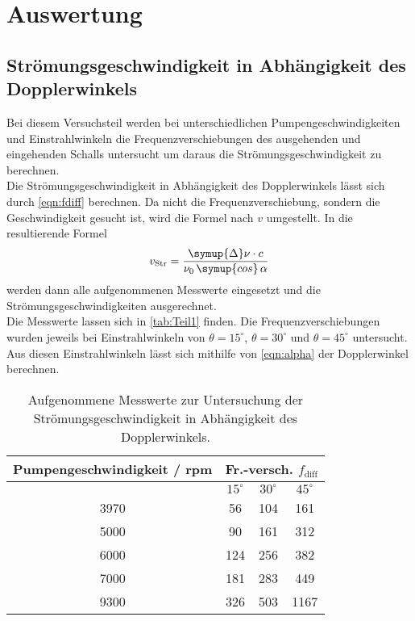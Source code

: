 \section{Auswertung}
\label{sec:Auswertung}

\subsection{Strömungsgeschwindigkeit in Abhängigkeit des Dopplerwinkels}

Bei diesem Versuchsteil werden bei unterschiedlichen Pumpengeschwindigkeiten und Einstrahlwinkeln die
Frequenzverschiebungen des ausgehenden und eingehenden Schalls untersucht um daraus die Strömungsgeschwindigkeit
zu berechnen.\\
Die Strömungsgeschwindigkeit in Abhängigkeit des Dopplerwinkels lässt sich durch \autoref{eqn:fdiff}
berechnen. Da nicht die Frequenzverschiebung, sondern die Geschwindigkeit gesucht ist, wird die Formel
nach $v$ umgestellt. In die resultierende Formel
\begin{equation*}
  v_{\mathrm{Str}} = \frac{\symup{\Delta}\nu\cdot c}{\nu_0\,\symup{cos}\,\alpha} 
\end{equation*}
werden dann alle aufgenommenen Messwerte eingesetzt und die Strömungsgeschwindigkeiten ausgerechnet.\\
Die Messwerte lassen sich in \autoref{tab:Teil1} finden. Die Frequenzverschiebungen wurden jeweils
bei Einstrahlwinkeln von $\theta= 15 ^{\circ}$, $\theta= 30 ^{\circ}$ und $\theta= 45 ^{\circ}$ untersucht.
Aus diesen Einstrahlwinkeln lässt sich mithilfe von \autoref{eqn:alpha} der Dopplerwinkel berechnen.\\
\begin{table}
  \centering
  \begin{tabular}{c | c | c | c}
    \toprule
    Pumpengeschwindigkeit / rpm & \multicolumn{3}{c}{Fr.-versch. $f_{\mathrm{diff}}$} \\
    \hline
     & $15^\circ$ & $30^\circ$ & $45^\circ$ \\
    \midrule
    3970     &       56     &     104     &    161 \\
    5000     &       90     &     161     &    312 \\
    6000     &       124    &     256     &    382\\
    7000     &       181    &     283     &    449\\
    9300     &       326    &     503    &    1167\\
    \bottomrule
  \end{tabular}
  \caption{Aufgenommene Messwerte zur Untersuchung der Strömungsgeschwindigkeit in Abhängigkeit des Dopplerwinkels.}
  \label{tab:Teil1}
\end{table}

